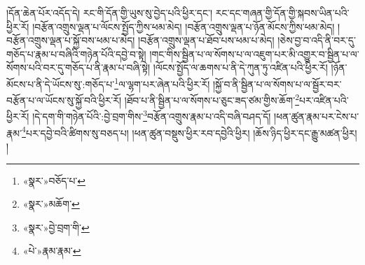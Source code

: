 །དོན་ཆེན་པོར་འདོད་དེ། རང་གི་དོན་གྱི་ཡུས་སུ་བྱེད་པའི་ཕྱིར་དང་། རང་དང་གཞན་གྱི་དོན་གྱི་སྐབས་ཡིན་པའི་ཕྱིར་རོ། །བརྩོན་འགྲུས་ལྡན་པ་ལོངས་སྤྱོད་ཀྱིས་ཕམ་མེད། །བརྩོན་འགྲུས་ལྡན་པ་ཉོན་མོངས་ཀྱིས་ཕམ་མེད། །བརྩོན་འགྲུས་ལྡན་པ་སྐྱོ་བས་ཕམ་པ་མེད། །བརྩོན་འགྲུས་ལྡན་པ་ཐོབ་པས་ཕམ་པ་མེད། །ཅེས་བྱ་བ་འདི་ནི་བར་དུ་གཅོད་པ་རྣམ་པ་བཞིའི་གཉེན་པོའི་དབྱེ་བ་སྟེ། །གང་གིས་སྦྱིན་པ་ལ་སོགས་པ་ལ་འཇུག་པར་མི་འགྱུར་བ་སྦྱིན་པ་ལ་སོགས་པའི་བར་དུ་གཅོད་པ་ནི་རྣམ་པ་བཞི་སྟེ། །ལོངས་སྤྱོད་ལ་ཆགས་པ་ནི་དེ་ཀུན་ཏུ་འཛིན་པའི་ཕྱིར་རོ། །ཉོན་མོངས་པ་ནི་དེ་ཡོངས་སུ་:གཅོད་པ་\footnote{«སྣར་»བཅོད་པ་}ལ་ལྷག་པར་ཞེན་པའི་ཕྱིར་རོ། །སྐྱོ་བ་ནི་སྦྱིན་པ་ལ་སོགས་པ་ལ་སྦྱོར་བར་བརྩོན་པ་ལ་ཡོངས་སུ་སྐྱོ་བའི་ཕྱིར་རོ། །ཐོབ་པ་ནི་སྦྱིན་པ་ལ་སོགས་པ་ཅུང་ཟད་ཙམ་གྱིས་ཆོག་\footnote{«སྣར་»མཆོག་}པར་འཛིན་པའི་ཕྱིར་རོ། །དེ་དག་གི་གཉེན་པོའི་:བྱེ་བྲག་གིས་\footnote{«སྣར་»བྱེ་བྲག་གི་}བརྩོན་འགྲུས་རྣམ་པ་འདི་བཞི་བཤད་དོ། །ཕན་ཚུན་རྣམ་པར་ངེས་པ་རྣམ་\footnote{«པེ་»རྣམ་རྣམ་}པར་དབྱེ་བའི་ཚིགས་སུ་བཅད་པ། །ཕན་ཚུན་བསྡུས་ཕྱིར་རབ་དབྱེའི་ཕྱིར། །ཆོས་ཉིད་ཕྱིར་དང་རྒྱུ་མཚན་ཕྱིར། །
